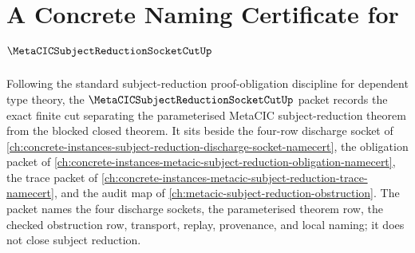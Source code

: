 \chapter{A Concrete Naming Certificate for $\MetaCICSubjectReductionSocketCutUp$}
\label{ch:concrete-instances-metacic-subject-reduction-socket-cut-namecert}

Following the standard subject-reduction proof-obligation discipline for dependent type theory, the $\MetaCICSubjectReductionSocketCutUp$ packet records the exact finite cut separating the parameterised MetaCIC subject-reduction theorem from the blocked closed theorem. It sits beside the four-row discharge socket of \autoref{ch:concrete-instances-subject-reduction-discharge-socket-namecert}, the obligation packet of \autoref{ch:concrete-instances-metacic-subject-reduction-obligation-namecert}, the trace packet of \autoref{ch:concrete-instances-metacic-subject-reduction-trace-namecert}, and the audit map of \autoref{ch:metacic-subject-reduction-obstruction}. The packet names the four discharge sockets, the parameterised theorem row, the checked obstruction row, transport, replay, provenance, and local naming; it does not close subject reduction.

